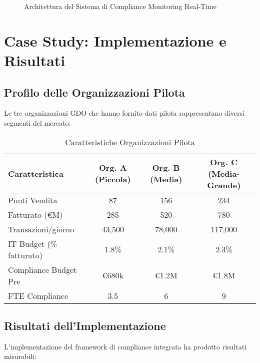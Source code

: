 \begin{figure}[H]
\centering
{}
\caption{Architettura del Sistema di Compliance Monitoring Real-Time}
\end{figure}

\section{Case Study: Implementazione e Risultati}

\subsection{Profilo delle Organizzazioni Pilota}

Le tre organizzazioni GDO che hanno fornito dati pilota rappresentano diversi segmenti del mercato:

\begin{table}[H]
\centering
\begin{tabular}{lccc}
\toprule
\textbf{Caratteristica} & \textbf{Org. A (Piccola)} & \textbf{Org. B (Media)} & \textbf{Org. C (Media-Grande)} \\
\midrule
Punti Vendita & 87 & 156 & 234 \\
Fatturato (€M) & 285 & 520 & 780 \\
Transazioni/giorno & 43,500 & 78,000 & 117,000 \\
IT Budget (\% fatturato) & 1.8\% & 2.1\% & 2.3\% \\
Compliance Budget Pre & €680k & €1.2M & €1.8M \\
FTE Compliance & 3.5 & 6 & 9 \\
\bottomrule
\end{tabular}
\caption{Caratteristiche Organizzazioni Pilota}
\end{table}

\subsection{Risultati dell'Implementazione}

L'implementazione del framework di compliance integrata ha prodotto risultati misurabili:

